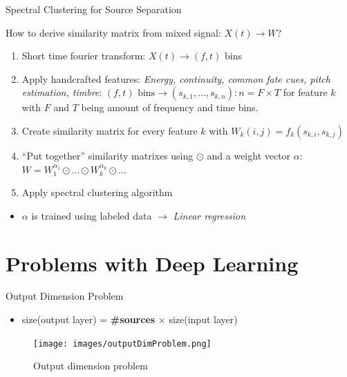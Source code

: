 \documentclass[xcolor=table,mathserif,9pt]{beamer}    %
\begin{document}
\begin{frame}{Spectral Clustering for Source Separation \cite{Bach:2006}}
	
How to derive similarity matrix from mixed signal: \emph{$X(t) \to W$}?
\vspace{10mm}
\begin{enumerate}
	\item Short time fourier transform: $X(t) \to (f,t)$ bins
	\item Apply handcrafted features: \emph{Energy, continuity, common fate cues, pitch estimation, timbre}: $(f,t) \text{ bins} \to (s_{k,1}, ...,s_{k,n}): n = F \times T$ for feature $k$ with $F$ and $T$ being amount of frequency and time bins.
	\item Create similarity matrix for every feature $k$ with $W_k(i,j) = f_k(s_{k,i},s_{k,j})$
	\item ``Put together'' similarity matrixes using $\odot$ and a  weight vector $\alpha$: $W = W_1^{\alpha_1} \odot ... \odot W_k^{\alpha_k} \odot ...$ 
	\item Apply spectral clustering algorithm 
\end{enumerate}
\vspace{10mm}

\begin{itemize}
	\item $\alpha$ is trained using labeled data $\to$ \emph{Linear regression}
\end{itemize}


\end{frame}

\section{Problems with Deep Learning}%
\label{sec:problems_with_deep_learning}
\begin{frame}{Output Dimension Problem \cite{SingleChannelSourceSeparation}}

\begin{itemize}
	\item size(output layer) = \textbf{\#sources} $\times$ size(input layer)
\end{itemize}

\begin{figure}[htpb]
	\centering
	\texttt{[image: images/outputDimProblem.png]}
	\caption{Output dimension problem}
\end{figure}

\end{frame}
\end{document}
